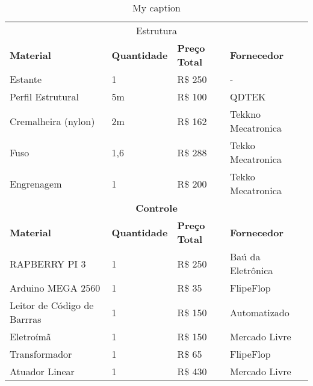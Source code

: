 \begin{table}[]
\centering
\caption{My caption}
\label{my-label}
\begin{tabular}{lllll}
\multicolumn{5}{c}{Estrutura}                                                                                                 \\
\textbf{Material}                    & \textbf{Quantidade} & \textbf{Preço Total} & \multicolumn{2}{l}{\textbf{Fornecedor}}   \\
Estante                              & 1                   & R\$ 250              & \multicolumn{2}{l}{-}                     \\
Perfil Estrutural                    & 5m                  & R\$ 100              & \multicolumn{2}{l}{QDTEK}                 \\
Cremalheira (nylon)                  & 2m                  & R\$ 162              & \multicolumn{2}{l}{Tekkno Mecatronica}    \\
Fuso                                 & 1,6                 & R\$ 288              & \multicolumn{2}{l}{Tekko Mecatronica}     \\
Engrenagem                           & 1                   & R\$ 200              & \multicolumn{2}{l}{Tekko Mecatronica}     \\
\multicolumn{5}{c}{\textbf{Controle}}                                                                                         \\
\textbf{Material}                    & \textbf{Quantidade} & \textbf{Preço Total} & \multicolumn{2}{l}{\textbf{Fornecedor}}   \\
RAPBERRY PI 3                        & 1                   & R\$ 250              & \multicolumn{2}{l}{Baú da Eletrônica}     \\
Arduino MEGA 2560                    & 1                   & R\$ 35               & \multicolumn{2}{l}{FlipeFlop}             \\
Leitor de Código de Barrras          & 1                   & R\$ 150              & \multicolumn{2}{l}{Automatizado}          \\
Eletroímã                            & 1                   & R\$ 150              & \multicolumn{2}{l}{Mercado Livre}         \\
Transformador                        & 1                   & R\$ 65               & \multicolumn{2}{l}{FlipeFlop}             \\
Atuador Linear                       & 1                   & R\$ 430              & \multicolumn{2}{l}{Mercado Livre}         \\

\end{tabular}
\end{table}
